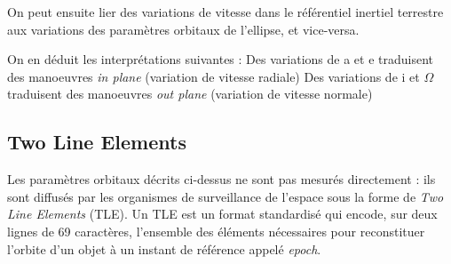 \documentclass{article}
\begin{document}
On peut ensuite lier des variations de vitesse dans le référentiel inertiel terrestre aux variations des paramètres orbitaux de l'ellipse, et vice-versa. 

\vspace{0.3cm}

\noindent{}
\vspace{0.3cm}

On en déduit les interprétations suivantes : 
Des variations de a et e traduisent des manoeuvres \textit{in plane}  (variation de vitesse radiale)
Des variations de i et $\Omega$ traduisent des  manoeuvres \textit{out plane} (variation de vitesse normale)

\subsection{Two Line Elements}

Les paramètres orbitaux décrits ci-dessus ne sont pas mesurés directement : ils sont diffusés par les organismes de surveillance de l'espace sous la forme de \textit{Two Line Elements} (TLE).
Un TLE est un format standardisé qui encode, sur deux lignes de 69 caractères, l'ensemble des éléments nécessaires pour reconstituer l'orbite d'un objet à un instant de référence appelé \textit{epoch}.

\vspace{0.3cm}
\noindent{}
\vspace{0.5cm}
\end{document}
